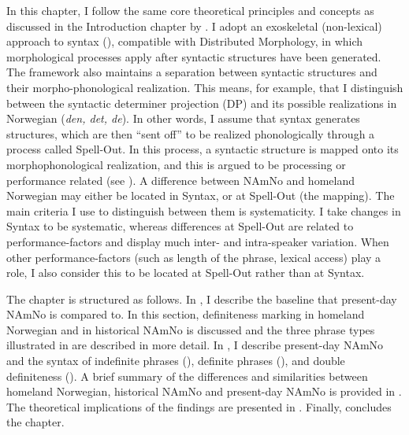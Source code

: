 \documentclass[output=paper]{langscibook}
\begin{document}
In this chapter, I follow the same core theoretical principles and concepts as discussed in the Introduction chapter by . I adopt an exoskeletal (non\hyp lexical) approach to syntax (\citealt{Borer2005a,Borer2005b,Lohndal2014}), compatible with Distributed Morphology, in which morphological processes apply after syntactic structures have been generated. The framework also maintains a separation between syntactic structures and their morpho\hyp phonological realization. This means, for example, that I distinguish between the syntactic determiner projection (DP) and its possible realizations in Norwegian (\textit{den, det, de}). In other words, I assume that syntax generates structures, which are then “sent off” to be realized phonologically through a process called Spell-Out. In this process, a syntactic structure is mapped onto its morphophonological realization, and this is argued to be processing or performance related (see \cites[394]{Benmamoun2021}[647]{Lohndal2021}{PutnamSanchez2013}). A difference between NAmNo and homeland Norwegian may either be located in Syntax, or at Spell-Out (the mapping). The main criteria I use to distinguish between them is systematicity. I take changes in Syntax to be systematic, whereas differences at Spell-Out are related to performance\hyp factors and display much inter- and intra\hyp speaker variation. When other performance-factors (such as length of the phrase, lexical access) play a role, I also consider this to be located at Spell-Out rather than at Syntax.
 
The chapter is structured as follows. In , I describe the baseline that present-day NAmNo is compared to. In this section, definiteness marking in homeland Norwegian and in historical NAmNo is discussed and the three phrase types illustrated in  are described in more detail. In , I describe present-day NAmNo and the syntax of indefinite phrases (), definite phrases (), and double definiteness (). A brief summary of the differences and similarities between homeland Norwegian, historical NAmNo and present-day NAmNo is provided in . The theoretical implications of the findings are presented in . Finally,  concludes the chapter.
 
\end{document}
